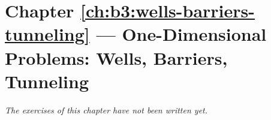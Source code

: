 \section*{Chapter \ref{ch:b3:wells-barriers-tunneling} --- One-Dimensional Problems: Wells, Barriers, Tunneling}


\emph{The exercises of this chapter have not been written yet.}
